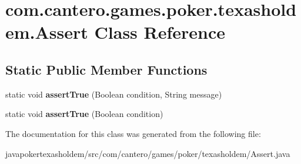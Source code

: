 \hypertarget{classcom_1_1cantero_1_1games_1_1poker_1_1texasholdem_1_1_assert}{}\section{com.\+cantero.\+games.\+poker.\+texasholdem.\+Assert Class Reference}
\label{classcom_1_1cantero_1_1games_1_1poker_1_1texasholdem_1_1_assert}
\subsection*{Static Public Member Functions}
\begin{DoxyCompactItemize}
\item 
\hypertarget{classcom_1_1cantero_1_1games_1_1poker_1_1texasholdem_1_1_assert_abef6d3d6a64cf8bcc440281dc3b2c349}{}static void {\bfseries assert\+True} (Boolean condition, String message)\label{classcom_1_1cantero_1_1games_1_1poker_1_1texasholdem_1_1_assert_abef6d3d6a64cf8bcc440281dc3b2c349}

\item 
\hypertarget{classcom_1_1cantero_1_1games_1_1poker_1_1texasholdem_1_1_assert_a8bb746026207532e7618ea010e478d90}{}static void {\bfseries assert\+True} (Boolean condition)\label{classcom_1_1cantero_1_1games_1_1poker_1_1texasholdem_1_1_assert_a8bb746026207532e7618ea010e478d90}

\end{DoxyCompactItemize}


The documentation for this class was generated from the following file\+:\begin{DoxyCompactItemize}
\item 
javapokertexasholdem/src/com/cantero/games/poker/texasholdem/Assert.\+java\end{DoxyCompactItemize}
